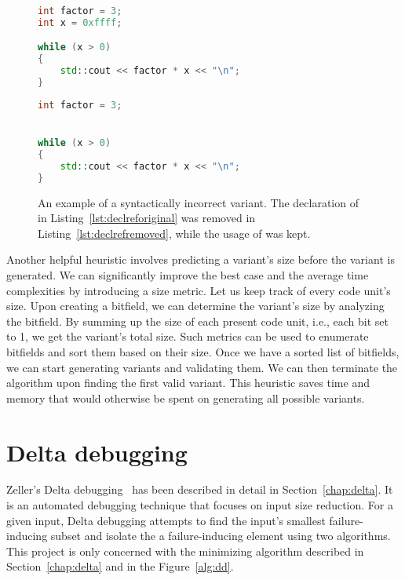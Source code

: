 \begin{figure}[H]
\begin{minipage}{0.46\textwidth}
\begin{lstlisting}[basicstyle=\small, caption=A variable declaration and its 
usage.,
  language=C++, label={lst:declreforiginal}]
int factor = 3;
int x = 0xffff;

while (x > 0)
{
	std::cout << factor * x << "\n";
}
\end{lstlisting}
\end{minipage}
\hfill
\begin{minipage}{.45\textwidth}
\begin{lstlisting}[basicstyle=\small, caption=Reference to an invalid 
declaration., language=C++, numbers=right, label={lst:declrefremoved}]
int factor = 3;


while (x > 0)
{
	std::cout << factor * x << "\n";
}
\end{lstlisting}
\end{minipage}
\caption{An example of a syntactically incorrect variant. The declaration
of  in Listing~\ref{lst:declreforiginal} was removed
in Listing~\ref{lst:declrefremoved}, while the usage of 
was kept.}
\label{lst:declref}
\end{figure}

Another helpful heuristic involves predicting a variant's size before 
the variant is generated. 
We can significantly improve the best case and the average time complexities 
by introducing a size metric. 
Let us keep track of every code unit's size. 
Upon creating a bitfield, we can determine the variant's size by analyzing 
the bitfield. 
By summing up the size of each present code unit, i.e., each bit set to 1, 
we get the variant's total size. 
Such metrics can be used to enumerate bitfields and sort them based on their 
size. 
Once we have a sorted list of bitfields, we can start generating variants 
and validating them. 
We can then terminate the algorithm upon finding the first valid variant. 
This heuristic saves time and memory that would otherwise be spent on 
generating all possible variants.

\section{Delta debugging}\label{chap:deltaanalysis}

Zeller's Delta debugging~\cite{Zeller99, Zeller02, Zeller01} has been 
described in detail in Section~\ref{chap:delta}.
It is an automated debugging technique that focuses on input size reduction.
For a given input, Delta debugging attempts to find the input's 
smallest failure-inducing subset and isolate the a failure-inducing element 
using two algorithms.
This project is only concerned with the minimizing algorithm described in
Section~\ref{chap:delta} and in the Figure~\ref{alg:dd}.

